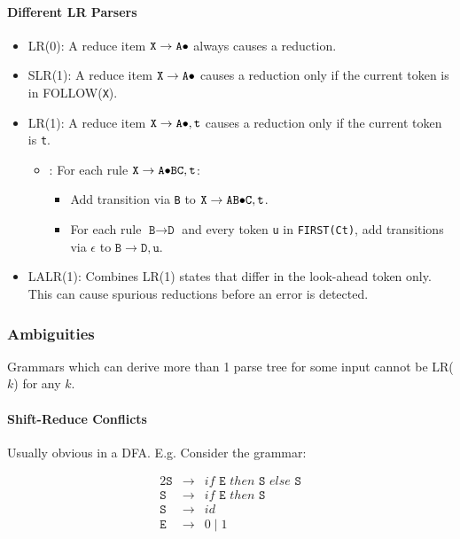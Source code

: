 \documentclass[twocolumn,english]{article}
\let\emph\relax
\begin{document}
\paragraph{Different LR Parsers}
\begin{itemize}
\item LR(0): A reduce item $\texttt{X}\rightarrow\texttt{A\ensuremath{\bullet}}$
always causes a reduction. 
\item SLR(1): A reduce item $\texttt{X}\rightarrow\texttt{A\ensuremath{\bullet}}$
causes a reduction only if the current token is in FOLLOW(\texttt{X}). 
\item LR(1): A reduce item $\texttt{X}\rightarrow\texttt{A\ensuremath{\bullet}},\texttt{t}$
causes a reduction only if the current token is \texttt{t}.
\begin{itemize}
\item \emph{FA Transitions}: For each rule $\texttt{X}\rightarrow\texttt{A\ensuremath{\bullet}BC},\texttt{t}$:
\begin{itemize}
\item Add transition via \texttt{B} to $\texttt{X}\rightarrow\texttt{AB\ensuremath{\bullet}C},\texttt{t}$. 
\item For each rule $\texttt{B}\rightarrow\texttt{D}$ and every token \texttt{u}
in \texttt{FIRST(Ct)}, add transitions via $\epsilon$ to $\texttt{B}\rightarrow\texttt{D},\texttt{u}$. 
\end{itemize}
\end{itemize}
\item LALR(1): Combines LR(1) states that differ in the look-ahead token
only. This can cause spurious reductions before an error is detected. 
\end{itemize}

\subsubsection{Ambiguities}

Grammars which can derive more than 1 parse tree for some input cannot
be LR($k$) for any $k$.

\paragraph{Shift-Reduce Conflicts}

Usually obvious in a DFA. E.g. Consider the grammar:

\begin{alignat*}{2}
\texttt{S} & \rightarrow & if\texttt{ E }then\texttt{ S }else\texttt{ S}\\
\texttt{S} & \rightarrow & if\texttt{ E }then\texttt{ S}\\
\texttt{S} & \rightarrow & id\\
\texttt{E} & \rightarrow & 0\mid1
\end{alignat*}
\end{document}
